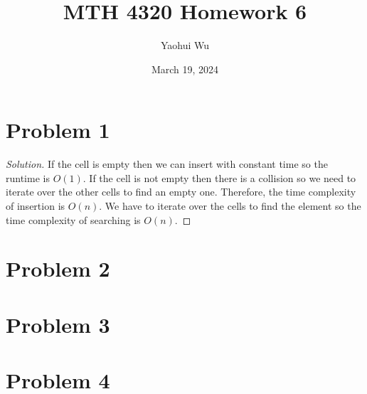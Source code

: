 \documentclass[12pt]{article}
\title{MTH 4320 Homework 6}
\author{Yaohui Wu}
\date{March 19, 2024}
\newenvironment*{solution}{\begin{proof}[Solution]}{\end{proof}}
\begin{document}
\maketitle
\section*{Problem 1}
\begin{solution}
    If the cell is empty then we can insert with constant time so the runtime
    is \(O(1)\). If the cell is not empty then there is a collision so we need
    to iterate over the other cells to find an empty one. Therefore, the time
    complexity of insertion is \(O(n)\). We have to iterate over the cells to
    find the element so the time complexity of searching is \(O(n)\).
\end{solution}
\section*{Problem 2}
\section*{Problem 3}
\section*{Problem 4}
\end{document}

